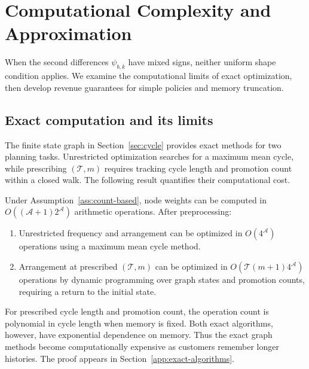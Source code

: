 \begingroup\color{black}
\section{Computational Complexity and Approximation}
\label{sec:approximation}
\label{sec:mixed-curvature}

When the second differences \(\psi_{b,k}\) have mixed signs, neither uniform shape condition applies. We examine the computational limits of exact optimization, then develop revenue guarantees for simple policies and memory truncation.

\subsection{Exact computation and its limits}
\label{sec:exact-algorithms}
\label{sec:arrangement-complexity}
\label{sec:long-optimal-periods}

The finite state graph in Section~\ref{sec:cycle} provides exact methods for two planning tasks. Unrestricted optimization searches for a maximum mean cycle, while prescribing \((\mathcal T,m)\) requires tracking cycle length and promotion count within a closed walk. The following result quantifies their computational cost.

\begin{proposition}
\label{prop:exact-algorithms}
Under Assumption~\ref{ass:count-based}, node weights can be computed in \(O((\mathcal A+1)2^{\mathcal A})\) arithmetic operations. After preprocessing:
\begin{enumerate}[label=(\roman*)]
\item Unrestricted frequency and arrangement can be optimized in \(O(4^{\mathcal A})\) operations using a maximum mean cycle method.
\item Arrangement at prescribed \((\mathcal T,m)\) can be optimized in \(O(\mathcal T(m+1)4^{\mathcal A})\) operations by dynamic programming over graph states and promotion counts, requiring a return to the initial state.
\end{enumerate}
\end{proposition}

\begingroup\color{black}
For prescribed cycle length and promotion count, the operation count is polynomial in cycle length when memory is fixed. Both exact algorithms, however, have exponential dependence on memory. Thus the exact graph methods become computationally expensive as customers remember longer histories. The proof appears in Section~\ref{app:exact-algorithms}.
\par\endgroup

